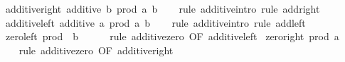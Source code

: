 \begin{isabellebody}
{\isafoldproof}%
%
\isadelimproof
\isanewline
%
\endisadelimproof
\isanewline
{}\isamarkupfalse%
\ additive{\isacharunderscore}{\kern0pt}right{\isacharcolon}{\kern0pt}\ {\isachardoublequoteopen}additive\ {\isacharparenleft}{\kern0pt}{\isasymlambda}b{\isachardot}{\kern0pt}\ prod\ a\ b{\isacharparenright}{\kern0pt}{\isachardoublequoteclose}\isanewline
%
\isadelimproof
\ \ %
\endisadelimproof
%
\isatagproof
{}\isamarkupfalse%
\ {\isacharparenleft}{\kern0pt}rule\ additive{\isachardot}{\kern0pt}intro{\isacharcomma}{\kern0pt}\ rule\ add{\isacharunderscore}{\kern0pt}right{\isacharparenright}{\kern0pt}%
\endisatagproof
{\isafoldproof}%
%
\isadelimproof
\isanewline
%
\endisadelimproof
\isanewline
{}\isamarkupfalse%
\ additive{\isacharunderscore}{\kern0pt}left{\isacharcolon}{\kern0pt}\ {\isachardoublequoteopen}additive\ {\isacharparenleft}{\kern0pt}{\isasymlambda}a{\isachardot}{\kern0pt}\ prod\ a\ b{\isacharparenright}{\kern0pt}{\isachardoublequoteclose}\isanewline
%
\isadelimproof
\ \ %
\endisadelimproof
%
\isatagproof
{}\isamarkupfalse%
\ {\isacharparenleft}{\kern0pt}rule\ additive{\isachardot}{\kern0pt}intro{\isacharcomma}{\kern0pt}\ rule\ add{\isacharunderscore}{\kern0pt}left{\isacharparenright}{\kern0pt}%
\endisatagproof
{\isafoldproof}%
%
\isadelimproof
\isanewline
%
\endisadelimproof
\isanewline
{}\isamarkupfalse%
\ zero{\isacharunderscore}{\kern0pt}left{\isacharcolon}{\kern0pt}\ {\isachardoublequoteopen}prod\ {}\ b\ {\isacharequal}{\kern0pt}\ {}{\isachardoublequoteclose}\isanewline
%
\isadelimproof
\ \ %
\endisadelimproof
%
\isatagproof
{}\isamarkupfalse%
\ {\isacharparenleft}{\kern0pt}rule\ additive{\isachardot}{\kern0pt}zero\ {\isacharbrackleft}{\kern0pt}OF\ additive{\isacharunderscore}{\kern0pt}left{\isacharbrackright}{\kern0pt}{\isacharparenright}{\kern0pt}%
\endisatagproof
{\isafoldproof}%
%
\isadelimproof
\isanewline
%
\endisadelimproof
\isanewline
{}\isamarkupfalse%
\ zero{\isacharunderscore}{\kern0pt}right{\isacharcolon}{\kern0pt}\ {\isachardoublequoteopen}prod\ a\ {}\ {\isacharequal}{\kern0pt}\ {}{\isachardoublequoteclose}\isanewline
%
\isadelimproof
\ \ %
\endisadelimproof
%
\isatagproof
{}\isamarkupfalse%
\ {\isacharparenleft}{\kern0pt}rule\ additive{\isachardot}{\kern0pt}zero\ {\isacharbrackleft}{\kern0pt}OF\ additive{\isacharunderscore}{\kern0pt}right{\isacharbrackright}{\kern0pt}{\isacharparenright}{\kern0pt}%
\endisatagproof
{\isafoldproof}%
%
\isadelimproof
\isanewline
%
\endisadelimproof

\end{isabellebody}
